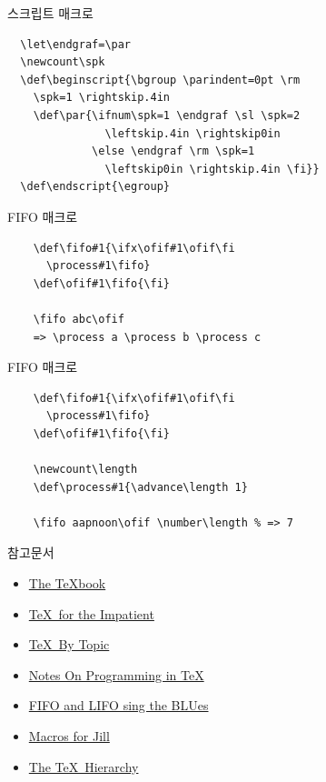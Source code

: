 \documentclass{beamer}
\begin{document}
%
\begin{frame}[fragile]{스크립트 매크로}
  \begin{verbatim}
  \let\endgraf=\par
  \newcount\spk
  \def\beginscript{\bgroup \parindent=0pt \rm
    \spk=1 \rightskip.4in
    \def\par{\ifnum\spk=1 \endgraf \sl \spk=2
               \leftskip.4in \rightskip0in
             \else \endgraf \rm \spk=1
               \leftskip0in \rightskip.4in \fi}}
  \def\endscript{\egroup}
  \end{verbatim}
\end{frame}


%
\begin{frame}[fragile]{FIFO 매크로}
  \begin{verbatim}
    \def\fifo#1{\ifx\ofif#1\ofif\fi
      \process#1\fifo}
    \def\ofif#1\fifo{\fi}

    \fifo abc\ofif
    => \process a \process b \process c
  \end{verbatim}
\end{frame}


%
\begin{frame}[fragile]{FIFO 매크로}
  \begin{verbatim}
    \def\fifo#1{\ifx\ofif#1\ofif\fi
      \process#1\fifo}
    \def\ofif#1\fifo{\fi}

    \newcount\length
    \def\process#1{\advance\length 1}

    \fifo aapnoon\ofif \number\length % => 7
  \end{verbatim}
\end{frame}


%
\begin{frame}{참고문서}
  \begin{itemize}
  \item \href{http://ftp.ktug.org/tex-archive/systems/knuth/dist/tex/}
    {The \TeX book}
  \item \href{http://ftp.ktug.org/tex-archive/info/impatient/book.pdf}
    {\TeX\ for the Impatient}
  \item \href{http://ftp.ktug.org/tex-archive/info/texbytopic/TeXbyTopic.pdf}
    {\TeX\ By Topic}
  \item \href{http://pgfplots.sourceforge.net/TeX-programming-notes.pdf}
    {Notes On Programming in TeX}
  \item \href{https://www.tug.org/TUGboat/tb14-1/tb38laan.pdf}
    {FIFO and LIFO sing the BLUes}
  \item \href{https://www.tug.org/TUGboat/tb08-3/tb19knut.pdf}
    {Macros for Jill}
  \item \href{https://www.tug.org/TUGboat/tb15-1/tb42arseneau.pdf}
    {The TeX\ Hierarchy}
  \end{itemize}
\end{frame}


%
\end{document}
